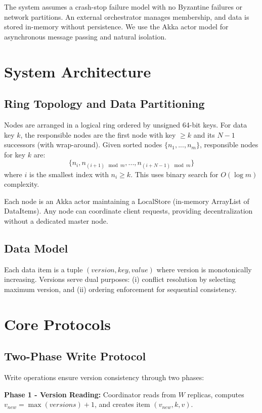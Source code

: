 \documentclass{article}
\begin{document}
The system assumes a crash-stop failure model with no Byzantine failures or network partitions. An external orchestrator manages membership, and data is stored in-memory without persistence. We use the Akka actor model for asynchronous message passing and natural isolation.

\section{System Architecture}

\subsection{Ring Topology and Data Partitioning}

Nodes are arranged in a logical ring ordered by unsigned 64-bit keys. For data key $k$, the responsible nodes are the first node with key $\geq k$ and its $N-1$ successors (with wrap-around). Given sorted nodes $\{n_1, ..., n_m\}$, responsible nodes for key $k$ are:
$$\{n_i, n_{(i+1)\mod{m}}, ..., n_{(i+N-1)\mod{m}}\}$$
where $i$ is the smallest index with $n_i \geq k$. This uses binary search for $O(\log m)$ complexity.

Each node is an Akka actor maintaining a LocalStore (in-memory ArrayList of DataItems). Any node can coordinate client requests, providing decentralization without a dedicated master node.

\subsection{Data Model}

Each data item is a tuple $(version, key, value)$ where version is monotonically increasing. Versions serve dual purposes: (i) conflict resolution by selecting maximum version, and (ii) ordering enforcement for sequential consistency.

\section{Core Protocols}

\subsection{Two-Phase Write Protocol}

Write operations ensure version consistency through two phases:

\textbf{Phase 1 - Version Reading:} Coordinator reads from $W$ replicas, computes $v_{new} = \max(versions) + 1$, and creates item $(v_{new}, k, v)$.
\end{document}

